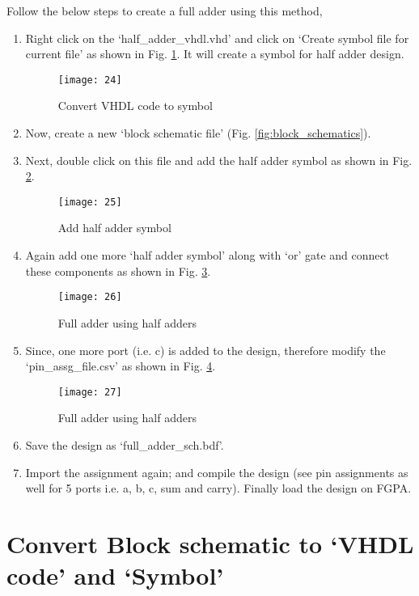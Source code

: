 Follow the below steps to create a full adder using this method,


\begin{enumerate}
	\item Right click on the `half\_adder\_vhdl.vhd' and click on `Create symbol file for current file' as shown in Fig. \ref{fig:vhdl_to_symbol}. It will create a symbol for half adder design. 

	\begin{figure}
		\centering
		\texttt{[image: 24]}
		\caption{Convert VHDL code to symbol}
		\label{fig:vhdl_to_symbol}
	\end{figure}
%	
	\item Now, create a new `block schematic file' (Fig. \ref{fig:block_schematics}). 
	\item Next, double click on this file and add the half adder symbol as shown in Fig. \ref{fig:ha_symbol}.
	
	\begin{figure}
		\centering
		\texttt{[image: 25]}
		\caption{Add half adder symbol}
		\label{fig:ha_symbol}
	\end{figure}
%	
	\item Again add one more `half adder symbol' along with `or' gate and connect these components as shown in Fig. \ref{fig:fa_design}. 
	
		\begin{figure}
			\centering
			\texttt{[image: 26]}
			\caption{Full adder using half adders}
			\label{fig:fa_design}
		\end{figure}
		
	\item Since, one more port (i.e. c) is added to the design, therefore modify the `pin\_assg\_file.csv' as shown in Fig. \ref{fig:update_pin_assg}. 
	
		\begin{figure}
			\centering
			\texttt{[image: 27]}
			\caption{Full adder using half adders}
			\label{fig:update_pin_assg}
		\end{figure}
%		
	\item Save the design as `full\_adder\_sch.bdf'. 
	\item Import the assignment again; and compile the design (see pin assignments as well for 5 ports i.e. a, b, c, sum and carry). Finally load the design on FGPA. 
\end{enumerate}

\section{Convert Block schematic to `VHDL code' and `Symbol'}

